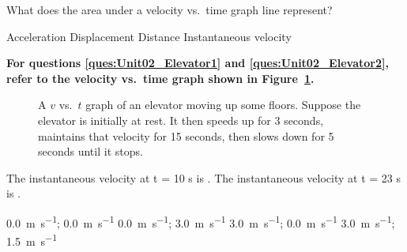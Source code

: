 \documentclass[]{exam}
\begin{document}
\begin{questions}
\begin{questions}
\question
What does the area under a velocity vs.~time graph line represent?

\begin{choices}
\choice Acceleration
\CorrectChoice Displacement
\choice Distance
\choice Instantaneous velocity
\end{choices}

\begin{EnvUplevel}
\textbf{For questions \ref{ques:Unit02_Elevator1} and \ref{ques:Unit02_Elevator2}, refer to the velocity vs.~time graph shown in Figure~\ref{fig:Unit02_Fig2.20}.}
\end{EnvUplevel}

\begin{figure}[h!]
    \centering
    \caption{A $v$ vs.~$t$ graph of an elevator moving up some floors. Suppose the elevator is initially at rest. It then speeds up for 3 seconds, maintains that velocity for 15 seconds, then slows down for 5 seconds until it stops.}
    \label{fig:Unit02_Fig2.20}
\end{figure}

\question \label{ques:Unit02_Elevator1}

The instantaneous velocity at t = 10 s is \underline{\hspace{2cm}}. The instantaneous velocity at t = 23 s is \underline{\hspace{2cm}}.

\begin{choices}
\choice \SI[per-mode=symbol]{0.0}{\meter\per\second}; \SI[per-mode=symbol]{0.0}{\meter\per\second}
\choice \SI[per-mode=symbol]{0.0}{\meter\per\second}; \SI[per-mode=symbol]{3.0}{\meter\per\second}
\CorrectChoice \SI[per-mode=symbol]{3.0}{\meter\per\second}; \SI[per-mode=symbol]{0.0}{\meter\per\second}
\choice \SI[per-mode=symbol]{3.0}{\meter\per\second}; \SI[per-mode=symbol]{1.5}{\meter\per\second}
\end{choices}


\end{questions}
\end{questions}
\end{document}
